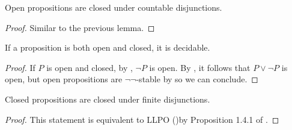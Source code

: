 \begin{lemma}\label{OpenCountableDisjunction}
  Open propositions are closed under countable disjunctions. 
\end{lemma}
\begin{proof}
  Similar to the previous lemma. 
\end{proof}

\begin{corollary}\label{ClopenDecidable}
  If a proposition is both open and closed, it is decidable. 
\end{corollary}
\begin{proof}
  If $P$ is open and closed, by , $\neg P$ is open.
  By , it follows that $P\vee \neg P$ is open, but open propositions are $\neg\neg$-stable by  so we can conclude.
%  
\end{proof}

\begin{lemma}\label{ClosedFiniteDisjunction} 
  Closed propositions are closed under finite disjunctions. 
\end{lemma}
\begin{proof}
  This statement is equivalent to LLPO ()by  
  Proposition 1.4.1 of \cite{HannesDiener}. 
\end{proof}

